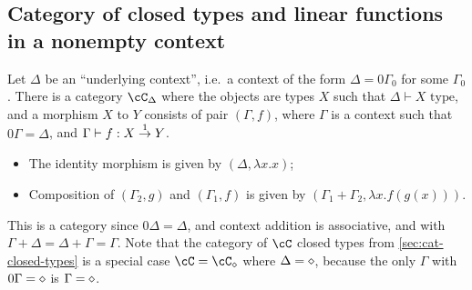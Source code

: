 \documentclass[12pt,a4paper]{article}
\begin{document}
\subsection{Category of closed types and linear functions in a nonempty context}

Let $\Delta$ be an ``underlying context'', i.e.\ a context of the form $\Delta = 0\Gamma_0$ for some $\Gamma_0$. There is a category $\cC_\Delta$ where the objects are types   $X$ such that $\Delta \vdash X \text{ type}$, and a morphism $X$ to $Y$ consists of pair $(\Gamma, f)$, where $\Gamma$ is a context such that $0\Gamma = \Delta$, and $\Gamma \vdash f : X \overset{1}{\to} Y$.

\begin{itemize}
\item The identity morphism is given by $(\Delta, \lambda x . x)$;
\item Composition of $(\Gamma_2, g)$ and $(\Gamma_1, f)$ is given by $(\Gamma_1 + \Gamma_2, \lambda x . f(g(x)))$.
\end{itemize}

This is a category since $0\Delta = \Delta$, and context addition is associative, and with $\Gamma + \Delta = \Delta + \Gamma = \Gamma$. Note that the category of $\cC$ closed types from \cref{sec:cat-closed-types} is a special case $\cC = \cC_{\emptyCtxt}$ where $\Delta = \diamond$, because the only $\Gamma$ with $0\Gamma = \diamond$ is $\Gamma = \diamond$.
\end{document}
